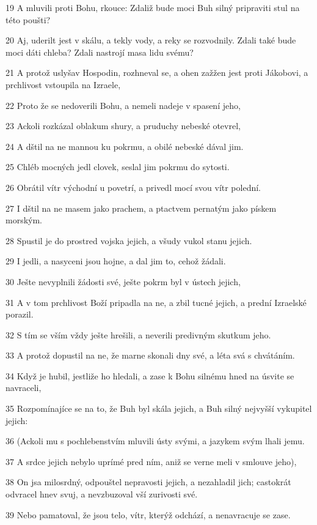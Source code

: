 \par 19 A mluvili proti Bohu, rkouce: Zdaliž bude moci Buh silný pripraviti stul na této poušti?
\par 20 Aj, uderilt jest v skálu, a tekly vody, a reky se rozvodnily. Zdali také bude moci dáti chleba? Zdali nastrojí masa lidu svému?
\par 21 A protož uslyšav Hospodin, rozhneval se, a ohen zažžen jest proti Jákobovi, a prchlivost vstoupila na Izraele,
\par 22 Proto že se nedoverili Bohu, a nemeli nadeje v spasení jeho,
\par 23 Ackoli rozkázal oblakum shury, a pruduchy nebeské otevrel,
\par 24 A dštil na ne mannou ku pokrmu, a obilé nebeské dával jim.
\par 25 Chléb mocných jedl clovek, seslal jim pokrmu do sytosti.
\par 26 Obrátil vítr východní u povetrí, a privedl mocí svou vítr polední.
\par 27 I dštil na ne masem jako prachem, a ptactvem pernatým jako pískem morským.
\par 28 Spustil je do prostred vojska jejich, a všudy vukol stanu jejich.
\par 29 I jedli, a nasyceni jsou hojne, a dal jim to, cehož žádali.
\par 30 Ješte nevyplnili žádosti své, ješte pokrm byl v ústech jejich,
\par 31 A v tom prchlivost Boží pripadla na ne, a zbil tucné jejich, a prední Izraelské porazil.
\par 32 S tím se vším vždy ješte hrešili, a neverili predivným skutkum jeho.
\par 33 A protož dopustil na ne, že marne skonali dny své, a léta svá s chvátáním.
\par 34 Když je hubil, jestliže ho hledali, a zase k Bohu silnému hned na úsvite se navraceli,
\par 35 Rozpomínajíce se na to, že Buh byl skála jejich, a Buh silný nejvyšší vykupitel jejich:
\par 36 (Ackoli mu s pochlebenstvím mluvili ústy svými, a jazykem svým lhali jemu.
\par 37 A srdce jejich nebylo uprímé pred ním, aniž se verne meli v smlouve jeho),
\par 38 On jsa milosrdný, odpouštel nepravosti jejich, a nezahladil jich; castokrát odvracel hnev svuj, a nevzbuzoval vší zurivosti své.
\par 39 Nebo pamatoval, že jsou telo, vítr, kterýž odchází, a nenavracuje se zase.
